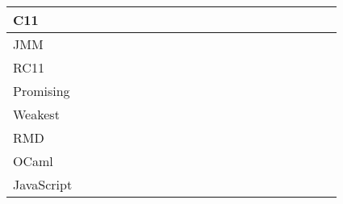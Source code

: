 \begin{landscape}
\begin{table*}
\begin{tabular}{|l|c|c|c|c|c|c|c|c|c|c|c|c|c|c|c|c|c|c|c|c|}
 C11            & & & & & & & & & & & & & & & & & & & & \\ \hline

 JMM            & & & & & & & & & & & & & & & & & & & & \\ \hline

 RC11           & & & & & & & & & & & & & & & & & & & & \\ \hline

 Promising      & & & & & & & & & & & & & & & & & & & & \\ \hline

 Weakest        & & & & & & & & & & & & & & & & & & & & \\ \hline

 RMD            & & & & & & & & & & & & & & & & & & & & \\ \hline

 OCaml          & & & & & & & & & & & & & & & & & & & & \\ \hline

 JavaScript     & & & & & & & & & & & & & & & & & & & & \\ \hline

\end{tabular}
\caption{
}
\label{table:summary}
\end{table*}


\end{landscape}

\twocolumn